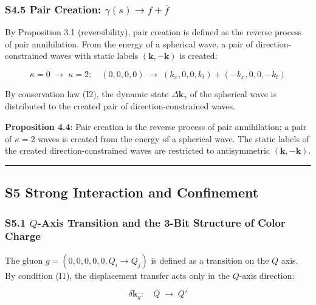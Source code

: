\documentclass[
  a4paper,11pt]{article}
\theoremstyle{definition}
\theoremstyle{remark}
\begin{document}
\subsubsection{\texorpdfstring{S4.5 Pair Creation:
\(\gamma(s) \to f + \bar{f}\)}{S4.5 Pair Creation: \textbackslash gamma(s) \textbackslash to f + \textbackslash bar\{f\}}}\label{s4.5-pair-creation-gammas-to-f-barf}

By Proposition 3.1 (reversibility), pair creation is defined as the
reverse process of pair annihilation. From the energy of a spherical
wave, a pair of direction-constrained waves with static labels
\((\mathbf{k}, -\mathbf{k})\) is created:

\[\kappa = 0 \;\longrightarrow\; \kappa = 2:\quad (0, 0, 0, 0) \;\longrightarrow\; (k_x, 0, 0, k_t) + (-k_x, 0, 0, -k_t)\]

By conservation law (I2), the dynamic state \(\Delta\mathbf{k}_\gamma\)
of the spherical wave is distributed to the created pair of
direction-constrained waves.

\textbf{Proposition 4.4}: Pair creation is the reverse process of pair
annihilation; a pair of \(\kappa = 2\) waves is created from the energy
of a spherical wave. The static labels of the created
direction-constrained waves are restricted to antisymmetric
\((\mathbf{k}, -\mathbf{k})\).

\begin{center}\rule{0.5\linewidth}{0.5pt}\end{center}

\subsection{S5 Strong Interaction and
Confinement}\label{s5-strong-interaction-and-confinement}

\subsubsection{\texorpdfstring{S5.1 \(Q\)-Axis Transition and the 3-Bit
Structure of Color
Charge}{S5.1 Q-Axis Transition and the 3-Bit Structure of Color Charge}}\label{s5.1-q-axis-transition-and-the-3-bit-structure-of-color-charge}

The gluon \(g = (0, 0, 0, 0, 0, Q_i \to Q_j)\) is defined as a
transition on the \(Q\) axis. By condition (I1), the displacement
transfer acts only in the \(Q\)-axis direction:

\[\delta\mathbf{k}_g: \quad Q \;\longrightarrow\; Q'\]
\end{document}
